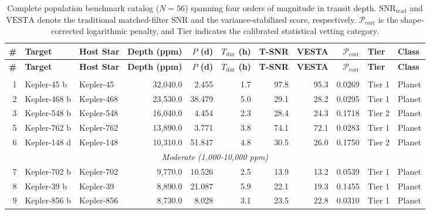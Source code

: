 {\footnotesize
\setlength{\tabcolsep}{2.5pt}
\begin{longtable}{r l l r r r r r r l l}
\caption{Complete population benchmark catalog ($N=56$) spanning four orders of magnitude in transit depth. $\text{SNR}_{\text{trad}}$ and $\text{VESTA}$ denote the traditional matched-filter SNR and the variance-stabilized score, respectively. $\mathcal{P}_{\text{corr}}$ is the shape-corrected logarithmic penalty, and Tier indicates the calibrated statistical vetting category.}\label{tab:full_population_catalog}\\
\hline\hline
\textbf{\#} & \textbf{Target} & \textbf{Host Star} & \textbf{Depth (ppm)} & \textbf{$P$ (d)} & \textbf{$T_{\text{dur}}$ (h)} & \textbf{T-SNR} & \textbf{VESTA} & \textbf{$\mathcal{P}_{\text{corr}}$} & \textbf{Tier} & \textbf{Class} \\
\hline
\endfirsthead
\hline\hline
\textbf{\#} & \textbf{Target} & \textbf{Host Star} & \textbf{Depth (ppm)} & \textbf{$P$ (d)} & \textbf{$T_{\text{dur}}$ (h)} & \textbf{T-SNR} & \textbf{VESTA} & \textbf{$\mathcal{P}_{\text{corr}}$} & \textbf{Tier} & \textbf{Class} \\
\hline
\endhead
\hline
\endfoot
\hline
\multicolumn{11}{c}{\textit{Ultra-Deep (>10,000 ppm)}} \\
\hline
 1 & Kepler-45 b      & Kepler-45    &  32,040.0 &   2.455 &   1.7 &   97.8 &   95.3 &  0.0269 & Tier 1  & Planet \\
 2 & Kepler-468 b     & Kepler-468   &  23,530.0 &  38.479 &   5.0 &   29.1 &   28.2 &  0.0295 & Tier 1  & Planet \\
 3 & Kepler-548 b     & Kepler-548   &  16,040.0 &   4.454 &   2.3 &   28.4 &   24.3 &  0.1718 & Tier 2  & Planet \\
 5 & Kepler-762 b     & Kepler-762   &  13,890.0 &   3.771 &   3.8 &   74.1 &   72.1 &  0.0283 & Tier 1  & Planet \\
 6 & Kepler-148 d     & Kepler-148   &  10,310.0 &  51.847 &   4.8 &   30.5 &   26.0 &  0.1750 & Tier 2  & Planet \\
\hline
\multicolumn{11}{c}{\textit{Moderate (1,000-10,000 ppm)}} \\
\hline
 7 & Kepler-702 b     & Kepler-702   &   9,770.0 &  10.526 &   2.5 &   13.9 &   13.2 &  0.0539 & Tier 1  & Planet \\
 8 & Kepler-39 b      & Kepler-39    &   8,890.0 &  21.087 &   5.9 &   22.1 &   19.3 &  0.1455 & Tier 1  & Planet \\
 9 & Kepler-856 b     & Kepler-856   &   8,730.0 &   8.028 &   3.1 &   23.5 &   22.8 &  0.0310 & Tier 1  & Planet \\

\end{longtable}}
